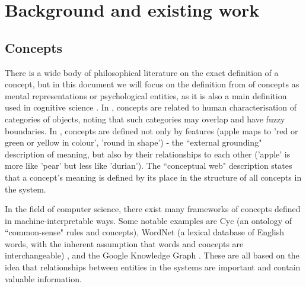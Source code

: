 \chapter{Background and existing work}





\section{Concepts}

There is a wide body of philosophical literature on the exact definition of a concept, but in this document we will focus on the definition from \cite{stanfordconcepts} of concepts as mental representations or psychological entities, as it is also a main definition used in cognitive science \cite{Pinker2007}. In \cite{NatureOfHumanConcepts}, concepts are related to human characterisation of categories of objects, noting that such categories may overlap and have fuzzy boundaries. In \cite{GOLDSTONE2002295}, concepts are defined not only by features (apple maps to 'red or green or yellow in colour', 'round in shape') - the ``external grounding" description of meaning, but also by their relationships to each other ('apple' is more like 'pear' but less like 'durian'). The ``conceptual web" description states that a concept's meaning is defined by its place in the structure of all concepts in the system. 

In the field of computer science, there exist many frameworks of concepts defined in machine-interpretable ways. Some notable examples are Cyc \cite{Cyc} (an ontology of ``common-sense" rules and concepts), WordNet (a lexical database of English words, with the inherent assumption that words and concepts are interchangeable) \cite{WordNet}, and the Google Knowledge Graph \cite{KnowledgeGraphs}. These are all based on the idea that relationships between entities in the systems are important and contain valuable information. 

